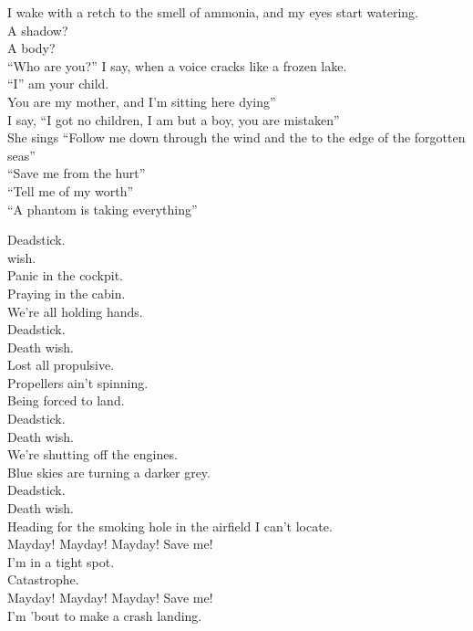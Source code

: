 I wake with a retch to the smell of ammonia, and my eyes start watering. \\
A shadow? \\
A body? \\
``Who are you?'' I say, when a voice cracks like a frozen lake. \\
``I'' am your child. \\
You are my mother, and I'm sitting here dying'' \\
I say, ``I got no children, I am but a boy, you are mistaken'' \\

She sings ``Follow me down through the wind and the  to the edge of the forgotten seas'' \\
``Save me from the hurt'' \\
``Tell me of my worth'' \\
``A phantom is taking everything'' \\


Deadstick. \\
 wish. \\
Panic in the cockpit. \\
Praying in the cabin. \\
We're all holding hands. \\
Deadstick. \\
Death wish. \\
Lost all propulsive. \\
Propellers ain't spinning. \\
Being forced to land. \\
Deadstick. \\
Death wish. \\
We're shutting off the engines. \\
Blue skies are turning a darker grey. \\
Deadstick. \\
Death wish. \\
Heading for the smoking hole in the airfield I can't locate. \\

Mayday! Mayday! Mayday! Save me! \\
I'm in a tight spot. \\
Catastrophe. \\
Mayday! Mayday! Mayday! Save me! \\
I'm 'bout to make a crash landing. \\

